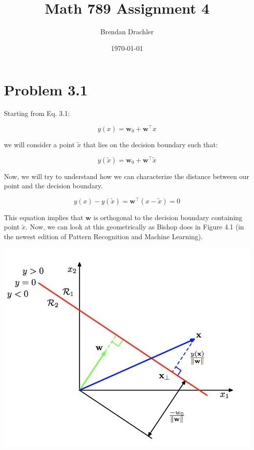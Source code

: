 \documentclass[12pt, letterpaper]{article}
\title{Math 789 Assignment 4}
\author{Brendan Drachler}
\date{\today}
\begin{document}
\maketitle

\section*{Problem 3.1}

Starting from Eq. 3.1:

\begin{equation}
y(x)=\mathbf{w}_{0}+\mathbf{w}^{\top} x
\end{equation}

we will consider a point $\tilde{x}$ that lies on the decision boundary such that:

\begin{equation}
y(\tilde{x})=\mathbf{w}_{0}+\mathbf{w}^{\top} \tilde{x}
\end{equation}

Now, we will try to understand how we can characterize the distance between our point and the decision boundary.

\begin{equation}
y(x) - y(\tilde{x}) = \mathbf{w}^{\top} ( x - \tilde{x}) = 0
\end{equation}

This equation implies that $\mathbf{w}$ is orthogonal to the decision boundary containing point $\tilde{x}$.  Now, we can look at this geometrically as Bishop does in Figure 4.1 (in the newest edition of Pattern Recognition and Machine Learning). 

\begin{center}
\includegraphics[scale=0.7]{problem_1_a.png}
\end{center}
\end{document}
